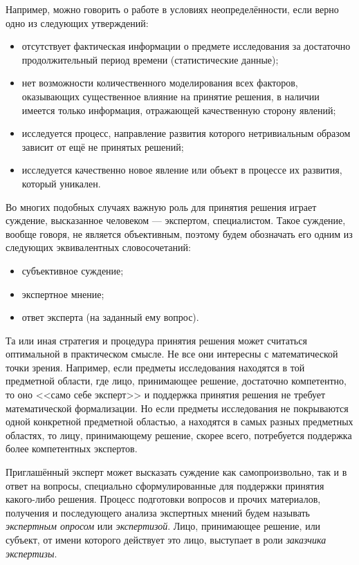 Например, можно говорить о работе в условиях неопределённости, если верно одно из следующих утверждений:
\begin{itemize}
 \item отсутствует фактическая информации о предмете исследования за достаточно продолжительный период времени (статистические данные);
 \item нет возможности количественного моделирования всех факторов, оказывающих существенное влияние на принятие решения, в наличии имеется только информация, отражающей качественную сторону явлений; 
 \item исследуется процесс, направление развития которого нетривиальным образом зависит от ещё не принятых решений;
 \item исследуется качественно новое явление или объект в процессе их развития, который уникален.
\end{itemize}

Во многих подобных случаях важную роль для принятия решения играет суждение, высказанное человеком --- экспертом, специалистом. Такое суждение, вообще говоря, не является объективным, поэтому будем обозначать его одним из следующих эквивалентных словосочетаний:
 \begin{itemize}
	\item субъективное суждение;
	\item экспертное мнение;
	\item ответ эксперта (на заданный ему вопрос). 
 \end{itemize}

Та или иная стратегия и процедура принятия решения может считаться оптимальной в практическом смысле. Не все они интересны с математической точки зрения. Например, если предметы исследования находятся в той предметной области, где лицо, принимающее решение, достаточно компетентно, то оно <<само себе эксперт>> и поддержка принятия решения не требует математической формализации. Но если предметы исследования не покрываются одной конкретной предметной областью, а находятся в самых разных предметных областях, то лицу, принимающему решение, скорее всего, потребуется  поддержка более компетентных экспертов. %
 
Приглашённый эксперт может высказать суждение как самопроизвольно, так и в ответ на вопросы, специально сформулированные для поддержки принятия какого-либо решения. Процесс подготовки вопросов и прочих материалов, получения и последующего анализа экспертных мнений будем называть {\sl экспертным опросом} или {\sl экспертизой}. Лицо, принимающее решение, или субъект, от имени которого действует это лицо, выступает в роли {\sl заказчика экспертизы}.
 
